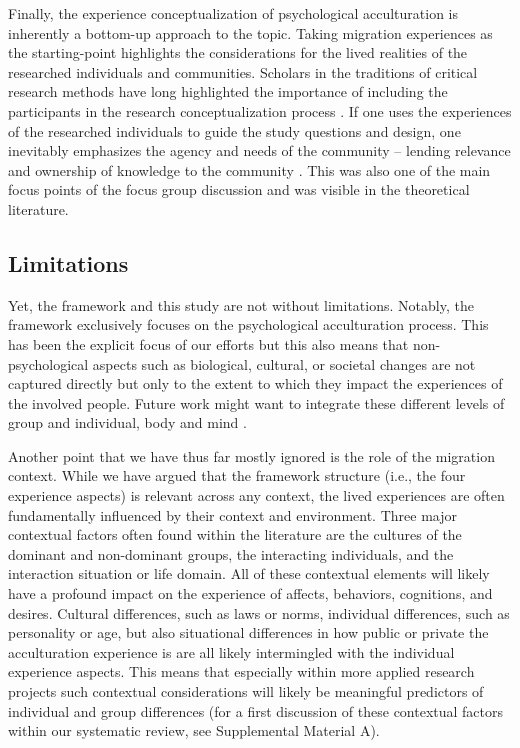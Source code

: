 \documentclass[man, 12pt, a4paper]{apa7}
\begin{document}
Finally, the experience conceptualization of psychological acculturation is inherently a bottom-up approach to the topic. Taking migration experiences as the starting-point highlights the considerations for the lived realities of the researched individuals and communities. Scholars in the traditions of critical research methods have long highlighted the importance of including the participants in the research conceptualization process \citep[e.g.,][]{Kovach2009}. If one uses the experiences of the researched individuals to guide the study questions and design, one inevitably emphasizes the agency and needs of the community -- lending relevance and ownership of knowledge to the community \citep[e.g., ][]{Schmidt2021}. This was also one of the main focus points of the focus group discussion and was visible in the theoretical literature.

\subsection{Limitations}
Yet, the framework and this study are not without limitations. Notably, the framework exclusively focuses on the psychological acculturation process. This has been the explicit focus of our efforts but this also means that non-psychological aspects such as biological, cultural, or societal changes are not captured directly but only to the extent to which they impact the experiences of the involved people. Future work might want to integrate these different levels of group and individual, body and mind \citep[e.g.,][]{Eronen2021}. 

Another point that we have thus far mostly ignored is the role of the migration context. While we have argued that the framework structure (i.e., the four experience aspects) is relevant across any context, the lived experiences are often fundamentally influenced by their context and environment. Three major contextual factors often found within the literature are the cultures of the dominant and non-dominant groups, the interacting individuals, and the interaction situation or life domain. All of these contextual elements will likely have a profound impact on the experience of affects, behaviors, cognitions, and desires. Cultural differences, such as laws or norms, individual differences, such as personality or age, but also situational differences in how public or private the acculturation experience is are all likely intermingled with the individual experience aspects. This means that especially within more applied research projects such contextual considerations will likely be meaningful predictors of individual and group differences (for a first discussion of these contextual factors within our systematic review, see Supplemental Material A). 
\end{document}
